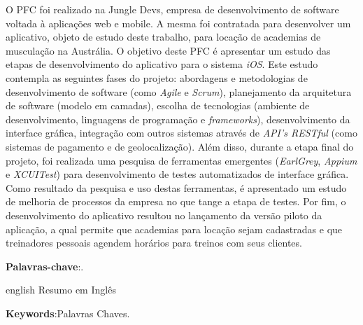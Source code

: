 

\setlength{\absparsep}{18pt} %
\begin{resumo}

O PFC foi realizado na Jungle Devs, empresa de desenvolvimento de software voltada à aplicações web e mobile. A mesma foi contratada para desenvolver um aplicativo, objeto de estudo deste trabalho, para locação de academias de musculação na Austrália. O objetivo deste PFC é apresentar um estudo das etapas de desenvolvimento do aplicativo para o sistema \textit{iOS}. Este estudo contempla as seguintes fases do projeto: abordagens e metodologias de desenvolvimento de software (como \textit{Agile} e \textit{Scrum}), planejamento da arquitetura de software (modelo em camadas), escolha de tecnologias (ambiente de desenvolvimento, linguagens de programação e \textit{frameworks}), desenvolvimento da interface gráfica, integração com outros sistemas através de \textit{API's RESTful} (como sistemas de pagamento e de geolocalização). Além disso, durante a etapa final do projeto, foi realizada uma pesquisa de ferramentas emergentes (\textit{EarlGrey}, \textit{Appium} e \textit{XCUITest}) para desenvolvimento de testes automatizados de interface gráfica. Como resultado da pesquisa e uso destas ferramentas, é apresentado um estudo de melhoria de processos da empresa no que tange a etapa de testes. Por fim, o desenvolvimento do aplicativo resultou no lançamento da versão piloto da aplicação, a qual permite que academias para locação sejam cadastradas e que treinadores pessoais agendem horários para treinos com seus clientes.





 \textbf{Palavras-chave}:.
\end{resumo}


\begin{resumo}[Abstract]
 \begin{otherlanguage*}{english}
Resumo em Inglês
   \vspace{\onelineskip}
 
   \noindent 
   \textbf{Keywords}:Palavras Chaves.
 \end{otherlanguage*}
\end{resumo}
